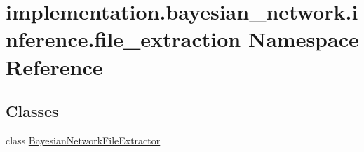 \hypertarget{namespaceimplementation_1_1bayesian__network_1_1inference_1_1file__extraction}{}\section{implementation.\+bayesian\+\_\+network.\+inference.\+file\+\_\+extraction Namespace Reference}
\label{namespaceimplementation_1_1bayesian__network_1_1inference_1_1file__extraction}
\subsection*{Classes}
\begin{DoxyCompactItemize}
\item 
class \hyperlink{classimplementation_1_1bayesian__network_1_1inference_1_1file__extraction_1_1_bayesian_network_file_extractor}{Bayesian\+Network\+File\+Extractor}
\end{DoxyCompactItemize}
